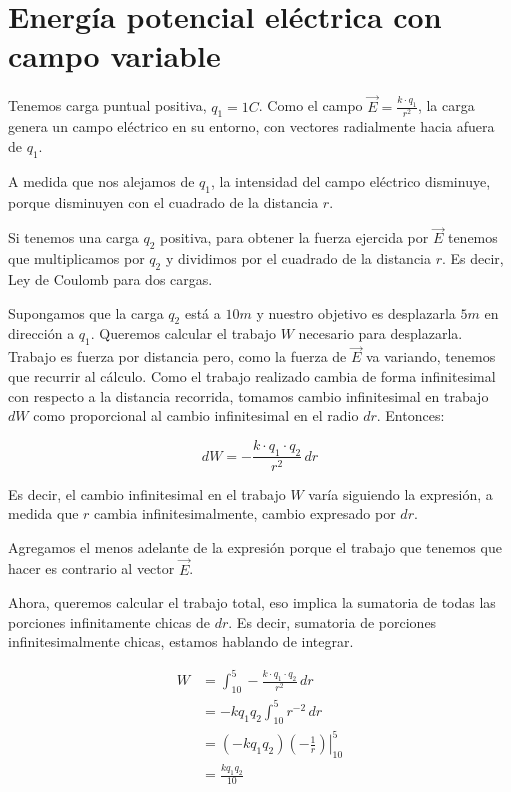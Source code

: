 \section{Energía potencial eléctrica con campo variable}

Tenemos carga puntual positiva,
\(q_1=1C\).
Como el campo \(\vec{E}=\frac{k\cdot q_1}{r^{2}}\),
la carga genera un campo eléctrico en su entorno,
con vectores radialmente hacia afuera de \(q_1\).

A medida que nos alejamos de \(q_1\),
la intensidad del campo eléctrico disminuye,
porque disminuyen con el cuadrado de la distancia \(r\).

Si tenemos una carga \(q_2\) positiva,
para obtener la fuerza ejercida por \(\vec{E}\)
tenemos que multiplicamos por \(q_2\) 
y dividimos por el cuadrado de la distancia \(r\).
Es decir, Ley de Coulomb para dos cargas.

Supongamos que la carga \(q_2\) está a \(10m\) 
y nuestro objetivo es desplazarla \(5m\)
en dirección a \(q_1\).
Queremos calcular el trabajo \(W\)
necesario para desplazarla.
Trabajo es fuerza por distancia pero,
como la fuerza de \(\vec{E}\) va variando,
tenemos que recurrir al cálculo.
Como el trabajo realizado cambia de forma infinitesimal con respecto a la distancia recorrida,
tomamos cambio infinitesimal en trabajo \(dW\) como proporcional
al cambio infinitesimal en el radio \(dr\).
Entonces:

\vspace{.5cm}
\begin{equation*}
    dW = -\frac{k\cdot q_1\cdot q_2}{r^{2}}\,dr
\end{equation*}
\vspace{.5cm}

Es decir,
el cambio infinitesimal en el trabajo \(W\) varía siguiendo la expresión,
a medida que \(r\) cambia infinitesimalmente, 
cambio expresado por \(dr\).

Agregamos el menos adelante de la expresión porque el trabajo que tenemos 
que hacer es contrario al vector \(\vec{E}\).

Ahora,
queremos calcular el trabajo total,
eso implica la sumatoria de todas las porciones infinitamente chicas 
de \(dr\).
Es decir,
sumatoria de porciones infinitesimalmente chicas, 
estamos hablando de integrar.

\begin{align*}
    W & = \int_{10}^{5}-\frac{k\cdot q_1\cdot q_2}{r^{2}}\,dr \\
    & = -kq_1q_2 \int_{10}^{5} r^{-2}\,dr \\
    & = (-kq_1q_2) \left.(-\frac{1}{r})\right|_{10}^{5} \\
    & = \boxed{\frac{kq_1q_2}{10}}
\end{align*}